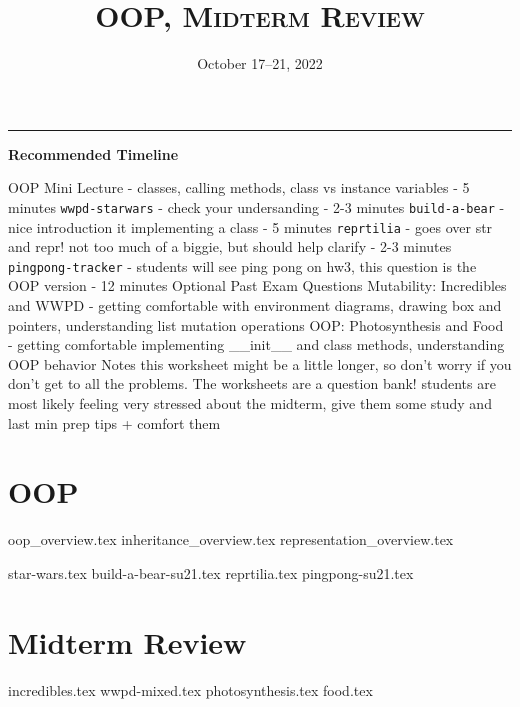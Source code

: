 \documentclass{exam}
\title{\textsc{OOP, Midterm Review}}
\date{October 17--21, 2022}
\begin{document}
	\maketitle
	\rule{\textwidth}{0.15em}
	\fontsize{12}{15}\selectfont

\begin{guide}
	\textbf{Recommended Timeline}
	\begin{outline}[enumerate]
		\1 OOP Mini Lecture - classes, calling methods, class vs instance variables - 5 minutes
		\1 \lstinline{wwpd-starwars} - check your undersanding - 2-3 minutes
		\1 \lstinline{build-a-bear} - nice introduction it implementing a class - 5 minutes
		\1 \lstinline{reprtilia} - goes over str and repr! not too much of a biggie, but should help clarify - 2-3 minutes
		\1 \lstinline{pingpong-tracker} - students will see ping pong on hw3, this question is the OOP version - 12 minutes
		\1 Optional Past Exam Questions
		\2 Mutability: Incredibles and WWPD - getting comfortable with environment diagrams, drawing box and pointers, understanding list mutation operations
		\2 OOP: Photosynthesis and Food - getting comfortable implementing __init__ and class methods, understanding OOP behavior
		\1 Notes
		\2 this worksheet might be a little longer, so don't worry if you don't get to all the problems. The worksheets are a question bank!
		\2 students are most likely feeling very stressed about the midterm, give them some study and last min prep tips + comfort them
	\end{outline}
\end{guide}


\section{OOP}
{oop_overview.tex}
{inheritance_overview.tex}
{representation_overview.tex}
\newpage
\begin{questions}
{star-wars.tex}
\newpage
{build-a-bear-su21.tex}
{reprtilia.tex}
{pingpong-su21.tex}
\end{questions}

\section{Midterm Review}
\begin{questions}
{incredibles.tex}
\newpage
{wwpd-mixed.tex}
\newpage
{photosynthesis.tex}
\newpage
{food.tex}
\end{questions}
\end{document}
